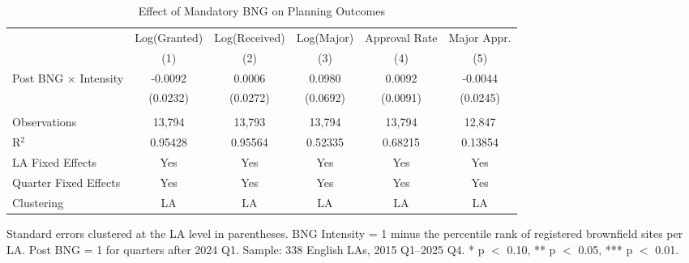 
\begin{table}[htbp]
   \caption{\label{tab:main_did} Effect of Mandatory BNG on Planning Outcomes}
   \bigskip
   \centering
   \footnotesize
   \begin{tabular}{lccccc}
      \toprule
                                   & Log(Granted)          & Log(Received)         & Log(Major)          & Approval Rate   & Major Appr. \\
                                   & (1)                   & (2)                   & (3)                 & (4)             & (5)\\
      \midrule 
      Post BNG $\times$ Intensity  & -0.0092               & 0.0006                & 0.0980              & 0.0092          & -0.0044\\   
                                   & (0.0232)              & (0.0272)              & (0.0692)            & (0.0091)        & (0.0245)\\   
       \\
      Observations                 & 13,794                & 13,793                & 13,794              & 13,794          & 12,847\\  
      R$^2$                        & 0.95428               & 0.95564               & 0.52335             & 0.68215         & 0.13854\\  
      LA Fixed Effects             & Yes                   & Yes                   & Yes                 & Yes             & Yes\\  
      Quarter Fixed Effects        & Yes                   & Yes                   & Yes                 & Yes             & Yes\\  
      Clustering                   & LA                    & LA                    & LA                  & LA              & LA\\  
      \bottomrule
   \end{tabular}
   
   \par \raggedright 
   Standard errors clustered at the LA level in parentheses. BNG Intensity = 1 minus the percentile rank of registered brownfield sites per LA. Post BNG = 1 for quarters after 2024 Q1. Sample: 338 English LAs, 2015 Q1--2025 Q4. * p $<$ 0.10, ** p $<$ 0.05, *** p $<$ 0.01.
\end{table}


